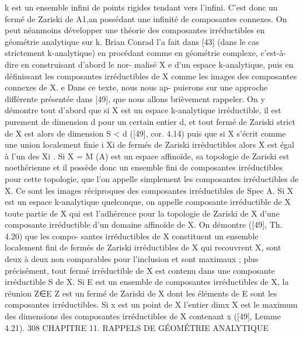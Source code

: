 \documentclass[
  10pt,
]{article}
\newenvironment{Shaded}{}{}
\newcommand{\NormalTok}[1]{#1}
\begin{document}
\begin{Shaded}
\begin{Highlighting}[]
\NormalTok{                                                                                    k      est}
\NormalTok{un ensemble infini de points rigides tendant vers l’infini. C’est donc un fermé de Zariski}
\NormalTok{de A1,an possédant une infinité de composantes connexes.}
\NormalTok{   On peut néanmoins développer une théorie des composantes irréductibles en géométrie}
\NormalTok{analytique sur k. Brian Conrad l’a fait dans [43] (dans le cas strictement k{-}analytique)}
\NormalTok{en procédant comme en géométrie complexe, c’est{-}à{-}dire en construisant d’abord le nor{-}}
\NormalTok{malisé X e d’un espace k{-}analytique, puis en définissant les composantes irréductibles de}
\NormalTok{X comme les images des composantes connexes de X.        e Dans ce texte, nous nous ap{-}}
\NormalTok{puierons sur une approche différente présentée dans [49], que nous allons brièvement}
\NormalTok{rappeler.}
\NormalTok{   On y démontre tout d’abord que si X est un espace k{-}analytique irréductible, il est}
\NormalTok{purement de dimension d pour un certain entier d, et tout fermé de Zariski strict de}
\NormalTok{X est alors de dimension}
\NormalTok{                  S          \textless{} d ([49], cor. 4.14) puis que si X s’écrit comme une union}
\NormalTok{localement finie i Xi de fermés de Zariski irréductibles alors X est égal à l’un des Xi .}
\NormalTok{   Si X = M (A) est un espace affinoïde, sa topologie de Zariski est noethérienne et il}
\NormalTok{possède donc un ensemble fini de composantes irréductibles pour cette topologie, que l’on}
\NormalTok{appelle simplement les composantes irréductibles de X. Ce sont les images réciproques}
\NormalTok{des composantes irréductibles de Spec A.}
\NormalTok{   Si X est un espace k{-}analytique quelconque, on appelle composante irréductible de X}
\NormalTok{toute partie de X qui est l’adhérence pour la topologie de Zariski de X d’une composante}
\NormalTok{irréductible d’un domaine affinoïde de X. On démontre ([49], Th. 4.20) que les compo{-}}
\NormalTok{santes irréductibles de X constituent un ensemble localement fini de fermés de Zariski}
\NormalTok{irréductibles de X qui recouvrent X, sont deux à deux non comparables pour l’inclusion}
\NormalTok{et sont maximaux ; plus précisément, tout fermé irréductible de X est contenu dans une}
\NormalTok{composante irréductible}
\NormalTok{                S          de X. Si E est un ensemble de composantes irréductibles de}
\NormalTok{X, la réunion Z∈E Z est un fermé de Zariski de X dont les éléments de E sont les}
\NormalTok{composantes irréductibles.}
\NormalTok{   Si x est un point de X l’entier dimx X est le maximum des dimensions des composantes}
\NormalTok{irréductibles de X contenant x ([49], Lemme 4.21).}
\NormalTok{308                 CHAPITRE 11. RAPPELS DE GÉOMÉTRIE ANALYTIQUE}


\end{Highlighting}
\end{Shaded}
\end{document}
